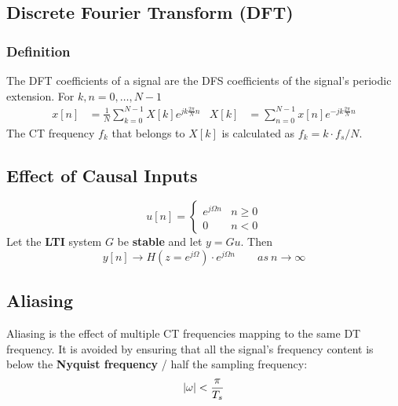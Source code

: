\subsection{Discrete Fourier Transform (DFT)}
\subsubsection{Definition}
The DFT coefficients of a signal are the DFS coefficients of the signal's periodic extension. For $k,n = 0, \hdots, N-1$
\begin{align*}
	x[n] &= \frac{1}{N}\!\!\sum\limits_{k=0}^{N-1}\!\!X[k]e^{j k \frac{2\pi}{N} n} & X[k] &=\!\!\!\! \sum\limits_{n=0}^{N-1} \!\! x[n]e^{-j k \frac{2\pi}{N} n}
\end{align*}
The CT frequency $f_k$ that belongs to $X[k]$ is calculated as $f_k = k\cdot f_s / N$.


\subsection{Effect of Causal Inputs}
    $$
        u[n] = \begin{cases}
            e^{j\Omega n} & n \geq 0\\
            0 & n < 0
        \end{cases}
    $$
    Let the \textbf{LTI} system $G$ be \textbf{stable} and let $y = G u$. Then
    $$
        y[n] \to H(z=e^{j\Omega}) \cdot e^{j\Omega n} \qquad as \ n \to \infty
    $$

\subsection{Aliasing}
Aliasing is the effect of multiple CT frequencies mapping to the same DT frequency.
It is avoided by ensuring that all the signal's frequency content is below the \textbf{Nyquist frequency} / half the sampling frequency:
$$\abs{\omega} < \frac{\pi}{T_s}$$

